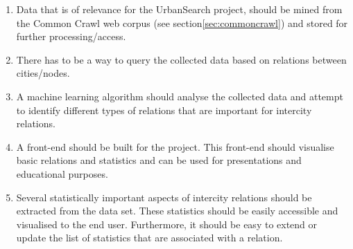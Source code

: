\begin{enumerate}
    \item Data that is of relevance for the UrbanSearch project, should be mined from the Common Crawl web corpus (see section\ref{sec:commoncrawl}) and stored for further processing/access.
    \item There has to be a way to query the collected data based on relations between cities/nodes.
    \item A machine learning algorithm should analyse the collected data and attempt to identify different types of relations that are important for intercity relations.
    \item A front-end should be built for the project. This front-end should visualise basic relations and statistics and can be used for presentations and educational purposes.
    \item Several statistically important aspects of intercity relations should be extracted from the data set. These statistics should be easily accessible and visualised to the end user. Furthermore, it should be easy to extend or update the list of statistics that are associated with a relation.
\end{enumerate}
\iffalse
\begin{enumerate}
    \item A user must be able to select place names.
    \item The system must display a map with the before mentioned places and the important connection they have to other places.
    \item A user must be able to choose a connection between two places and get information about what kind of relations they have.
    \item The strength of all relations must be displayed.
    \item The user must be able to export the found connections and their strengths between places.
    \item Data, that is of relevance for the UrbanSearch project, should be mined from the Common Crawl web corpus and stored for further processing/access. 
    \item A machine learning algorithm should analyse the collected data and attempt to identify different types of relations that are important for intercity relations.
    \item Several statistically important aspects of intercity relations should be extracted from the data set. These statistics should be easily accessible and understandable to the end user. Which statistics are important is one of the research topics of this project, so it should be easy to extend/update the list of statistics that are associated with a relation.

\end{enumerate}
\fi
